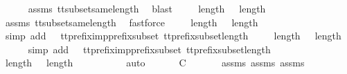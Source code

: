 \begin{isabellebody}
\ \ \ \ \isamarkupfalse%
\ {\isasymrho}{\isacharprime}{\isacharprime}{\isacharprime}{\isacharunderscore}assms\ tt{\isacharunderscore}subset{\isacharunderscore}same{\isacharunderscore}length\ \isamarkupfalse%
\ blast\isanewline
\ \ \isamarkupfalse%
\ {}{\isacharcolon}\ {\isachardoublequoteopen}length\ {\isasymrho}\ {\isacharequal}\ length\ {\isasymrho}{\isacharprime}{\isacharprime}{\isachardoublequoteclose}\isanewline
\ \ \ \ \isamarkupfalse%
\ {\isasymrho}{\isacharprime}{\isacharprime}{\isacharunderscore}assms\ tt{\isacharunderscore}subset{\isacharunderscore}same{\isacharunderscore}length\ \isamarkupfalse%
\ fastforce\isanewline
\ \ \isamarkupfalse%
\ {}{\isacharcolon}\ {\isachardoublequoteopen}length\ {\isasymrho}\ {\isasymle}\ length\ {\isasymrho}{\isacharprime}{\isachardoublequoteclose}\isanewline
\ \ \ \ \isamarkupfalse%
\ {\isacharparenleft}simp\ add{\isacharcolon}\ {\isachardoublequoteopen}{}{\isachardoublequoteclose}\ {\isachardoublequoteopen}{}{\isachardoublequoteclose}\ tt{\isacharunderscore}prefix{\isacharunderscore}imp{\isacharunderscore}prefix{\isacharunderscore}subset\ tt{\isacharunderscore}prefix{\isacharunderscore}subset{\isacharunderscore}length{\isacharparenright}\isanewline
\ \ \isamarkupfalse%
\ {}{\isacharcolon}\ {\isachardoublequoteopen}length\ {\isasymrho}{\isacharprime}\ {\isasymle}\ length\ {\isasymrho}{\isachardoublequoteclose}\isanewline
\ \ \ \ \isamarkupfalse%
\ {\isacharparenleft}simp\ add{\isacharcolon}\ {\isachardoublequoteopen}{}{\isachardoublequoteclose}\ {\isachardoublequoteopen}{}{\isachardoublequoteclose}\ tt{\isacharunderscore}prefix{\isacharunderscore}imp{\isacharunderscore}prefix{\isacharunderscore}subset\ tt{\isacharunderscore}prefix{\isacharunderscore}subset{\isacharunderscore}length{\isacharparenright}\isanewline
\ \ \isamarkupfalse%
\ {\isachardoublequoteopen}length\ {\isasymrho}{\isacharprime}\ {\isacharequal}\ length\ {\isasymrho}{\isachardoublequoteclose}\isanewline
\ \ \ \ \isamarkupfalse%
\ {}\ {}\ \isamarkupfalse%
\ auto\isanewline
\ \ \isamarkupfalse%
\ \isamarkupfalse%
\ {\isachardoublequoteopen}{\isasymrho}{\isacharprime}\ {\isasymsubseteq}\isactrlsub C\ {\isasymrho}{\isachardoublequoteclose}\isanewline
\ \ \ \ \isamarkupfalse%
\ assms{\isacharparenleft}{}{\isacharparenright}\ assms{\isacharparenleft}{}{\isacharparenright}\ assms{\isacharparenleft}{}{\isacharparenright}\ \isamarkupfalse%

\end{isabellebody}
